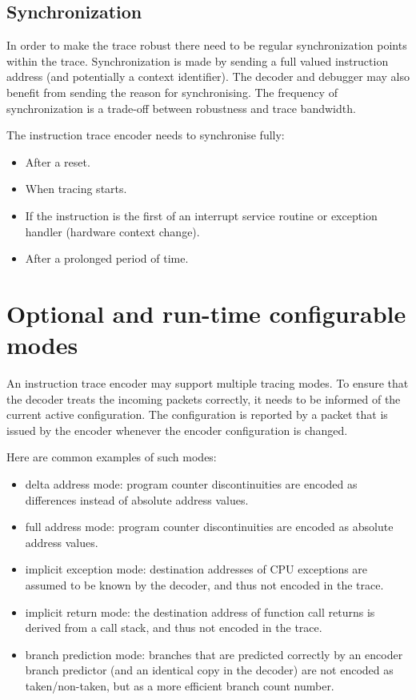 \subsection{Synchronization} \label{synchronization}

In order to make the trace robust there need to be regular
synchronization points within the trace. Synchronization is made by
sending a full valued instruction address (and potentially a context
identifier). The decoder and debugger may also benefit from sending
the reason for synchronising. The frequency of synchronization is a
trade-off between robustness and trace bandwidth.

The instruction trace encoder needs to synchronise fully:

\begin{itemize}

\item After a reset.
  \item When tracing starts.
\item If the instruction is the first of an interrupt service routine or
exception handler (hardware context change).
\item After a prolonged period of time.
\end{itemize}

\section{Optional and run-time configurable modes} \label{optional}

An instruction trace encoder may support multiple tracing modes.
To ensure that the decoder treats the incoming packets
correctly, it needs to be informed of the current active configuration.
The configuration is reported by a packet that is issued by the encoder
whenever the encoder configuration is changed.

Here are common examples of such modes:

\begin{itemize}
  \item delta address mode:
    program counter discontinuities are encoded as differences instead of absolute address values.
  \item full address mode:
    program counter discontinuities are encoded as absolute address values.
  \item implicit exception mode:
    destination addresses of CPU exceptions are assumed to be known by the decoder, and thus not encoded
    in the trace.
  \item implicit return mode:
    the destination address of function call returns is derived from a call stack, and thus not encoded
    in the trace.
  \item branch prediction mode:
    branches that are predicted correctly by an encoder branch predictor (and an identical copy in the decoder)
    are not encoded as taken/non-taken, but as a more efficient branch count number.
\end{itemize}

